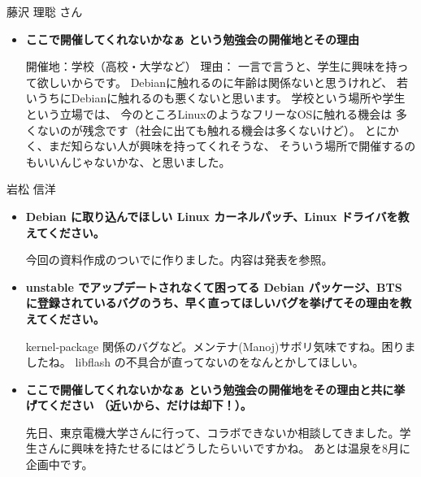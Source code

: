 \documentclass[cjk,dvipdfmx,12pt]{beamer}
\begin{document}
\begin{frame}{藤沢 理聡 さん}
\begin{itemize}
\item {\bf ここで開催してくれないかなぁ という勉強会の開催地とその理由}

開催地：学校（高校・大学など）
理由：
一言で言うと、学生に興味を持って欲しいからです。
Debianに触れるのに年齢は関係ないと思うけれど、
若いうちにDebianに触れるのも悪くないと思います。
学校という場所や学生という立場では、
今のところLinuxのようなフリーなOSに触れる機会は
多くないのが残念です（社会に出ても触れる機会は多くないけど）。
とにかく、まだ知らない人が興味を持ってくれそうな、
そういう場所で開催するのもいいんじゃないかな、と思いました。
\end{itemize}
\end{frame}

\begin{frame}{岩松 信洋}
\begin{itemize}
\item {\bf Debian に取り込んでほしい Linux カーネルパッチ、Linux ドライバを教えてください。}

今回の資料作成のついでに作りました。内容は発表を参照。

\item {\bf unstable でアップデートされなくて困ってる Debian パッケージ、BTS に登録されているバグのうち、早く直ってほしいバグを挙げてその理由を教えてください。}

kernel-package 関係のバグなど。メンテナ(Manoj)サボリ気味ですね。困りましたね。
libflash の不具合が直ってないのをなんとかしてほしい。

\item {\bf ここで開催してくれないかなぁ という勉強会の開催地をその理由と共に挙げてください （近いから、だけは却下！）。}

先日、東京電機大学さんに行って、コラボできないか相談してきました。学生さんに興味を持たせるにはどうしたらいいですかね。
あとは温泉を8月に企画中です。

\end{itemize}
\end{frame}



\end{document}
